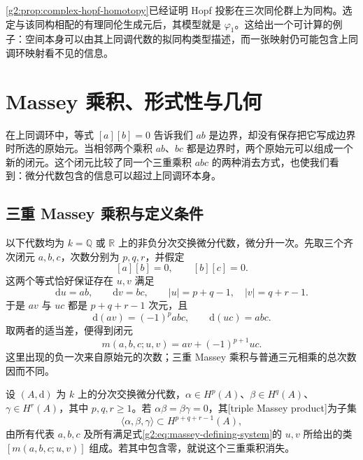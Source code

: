 \cref{g2:prop:complex-hopf-homotopy}已经证明 Hopf 投影在三次同伦群上为同构。选定与该同构相配的有理同伦生成元后，其模型就是 \(\varphi_1\)。这给出一个可计算的例子：空间本身可以由其上同调代数的拟同构类型描述，而一张映射仍可能包含上同调环映射看不见的信息。

\section{Massey 乘积、形式性与几何}
\label{g2:sec:E04}

在上同调环中，等式 \([a][b]=0\) 告诉我们 \(ab\) 是边界，却没有保存把它写成边界时所选的原始元。当相邻两个乘积 \(ab\)、\(bc\) 都是边界时，两个原始元可以组成一个新的闭元。这个闭元比较了同一个三重乘积 \(abc\) 的两种消去方式，也使我们看到：微分代数包含的信息可以超过上同调环本身。

\subsection{三重 Massey 乘积与定义条件}
\label{g2:subsec:E04:01}

以下代数均为 \(k=\mathbb Q\) 或 \(\mathbb R\) 上的非负分次交换微分代数，微分升一次。先取三个齐次闭元 \(a,b,c\)，次数分别为 \(p,q,r\)，并假定
\[
	[a][b]=0,\qquad [b][c]=0.
\]
这两个等式恰好保证存在 \(u,v\) 满足
\begin{equation}\label{g2:eq:massey-defining-system}
	\mathrm du=ab,\qquad \mathrm dv=bc,
	\qquad |u|=p+q-1,\quad |v|=q+r-1.
\end{equation}
于是 \(av\) 与 \(uc\) 都是 \(p+q+r-1\) 次元，且
\[
	\mathrm d(av)=(-1)^pabc,\qquad \mathrm d(uc)=abc.
\]
取两者的适当差，便得到闭元
\begin{equation}\label{g2:eq:massey-representative}
	m(a,b,c;u,v)=av+(-1)^{p+1}uc.
\end{equation}
这里出现的负一次来自原始元的次数；三重 Massey 乘积与普通三元相乘的总次数因而不同。

\begin{definition}\label{g2:def:triple-massey-product}
	设 \((A,\mathrm d)\) 为 \(k\) 上的分次交换微分代数，\(\alpha\in H^p(A)\)、\(\beta\in H^q(A)\)、\(\gamma\in H^r(A)\)，其中 \(p,q,r\geq1\)。若 \(\alpha\beta=\beta\gamma=0\)，其[triple Massey product]为子集
	\[
		\langle\alpha,\beta,\gamma\rangle
		\subset H^{p+q+r-1}(A),
	\]
	由所有代表 \(a,b,c\) 及所有满足式\eqref{g2:eq:massey-defining-system}的 \(u,v\) 所给出的类 \([m(a,b,c;u,v)]\) 组成。若其中包含零，就说这个三重乘积消失。
\end{definition}

